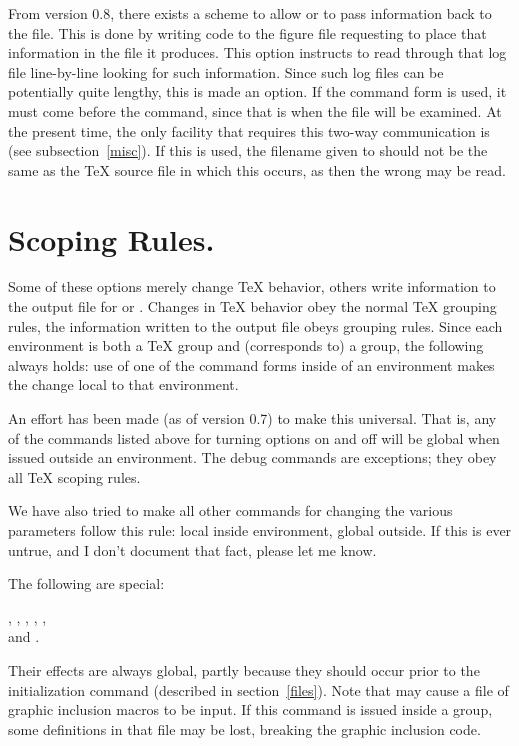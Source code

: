 \documentclass[letterpaper]{article}
\begin{document}
From version 0.8, there exists a scheme to allow \MF{} or \MP{} to pass
information back to the  file. This is done by writing code
to the figure file requesting \MF{} to place that information in the
 file it produces. This option instructs \mfp{} to
read through that log file line-by-line looking for such information.
Since such log files can be potentially quite lengthy, this is made an
option. If the command form  is used, it must come before
the  command, since that is when the file will be
examined. At the present time, the only \mfp{} facility that requires
this two-way communication is  (see
subsection~\ref{misc}). If this is used, the filename given to
 should not be the same as the \TeX{} source file in
which this occurs, as then the wrong  may be read.


\section{Scoping Rules.}\label{scoping}

Some of these options merely change \TeX{} behavior, others write
information to the output file for \MF{} or \MP{}. Changes in \TeX{}
behavior obey the normal \TeX{} grouping rules, the information written
to the output file obeys \MF{} grouping rules. Since each 
environment is both a \TeX{} group and (corresponds to) a \MF{} group,
the following always holds: use of one of the command forms inside of an
 environment makes the change local to that environment.

An effort has been made (as of version 0.7) to make this universal. That
is, any of the commands listed above for turning options on and off will
be global when issued outside an  environment. The debug
commands are exceptions; they obey all \TeX{} scoping rules.

We have also tried to make all other \mfp{} commands for changing the
various parameters follow this rule: local inside 
environment, global outside. If this is ever untrue, and I don't
document that fact, please let me know.

The following are special:
\begin{display}
,
,
,
,
,\\
and
.
\end{display}
\noindent Their effects are always global, partly because they should
occur prior to the initialization command  (described
in section~\ref{files}). Note that  may cause a file of
graphic inclusion macros to be input. If this command is issued inside a
group, some definitions in that file may be lost, breaking the graphic
inclusion code.
\end{document}
